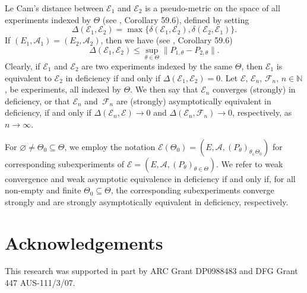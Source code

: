 \documentclass[number,citesort,seceqn,dvips]{arxbj}
\newcommand{\NN}{\mathbb{N}}
\newcommand{\AAA}{{\mathcal A}}
\newcommand{\EEE}{{\mathcal E}}
\newcommand{\FFF}{{\mathcal F}}
\begin{document}
\begin{appendix}
Le Cam's distance between $\EEE_1$ and $\EEE_2$ is a pseudo-metric on
the space of all experiments indexed by $\Theta$ (see
\cite{St85}, Corollary 59.6), defined by setting
%
\begin{equation}\label{deflecam}
\Delta(\EEE_1,\EEE_2) = \max\{
\delta(\EEE_1,\EEE_2),\delta(\EEE_2,\EEE_1) \}.
\end{equation}
%
If $(E_1,\AAA_1)=(E_2,\AAA_2)$, then we have (see
\cite{St85}, Corollary 59.6)
%
\begin{equation}\label{deflecamsmallerTV}
\Delta(\EEE_1,\EEE_2) \le
\sup_{\theta\in\Theta}\|P_{1,\theta}-P_{2,\theta}\| .
\end{equation}
%
Clearly, if $\EEE_1$ and $\EEE_2$ are two experiments indexed by the
same $\Theta$, then $\EEE_1$ is equivalent to $\EEE_2$ in deficiency if
and only if $\Delta(\EEE_1,\EEE_2)=0$. Let $\EEE$, $\EEE_n$, $\FFF_n$,
$n\in\NN$, be experiments, all indexed by $\Theta$. We then say that
$\EEE_n$ converges (strongly) in deficiency, or that $\EEE_n$ and~$\FFF_n$ are (strongly) asymptotically equivalent in deficiency, if and
only if $\Delta(\EEE_n,\EEE) \to0$ and $\Delta(\EEE_n,\FFF_n)
\to0$, respectively, as $n\to\infty$.

For $\varnothing\neq\Theta_0\subseteq\Theta$, we employ the notation
$\EEE(\Theta_0)=(E,\AAA,(P_{\theta})_{\theta_\in\Theta_0})$ for
corresponding subexperiments of
$\EEE=(E,\AAA,(P_\theta)_{\theta\in\Theta})$. We refer to weak
convergence and weak asymptotic equivalence in deficiency if and only
if, for all non-empty and finite $\Theta_0\subseteq\Theta$, the
corresponding subexperiments converge strongly and are strongly
asymptotically equivalent in deficiency, respectively.
\end{appendix}

\section*{Acknowledgements}
This research was supported in part by ARC Grant DP0988483 and DFG
Grant 447 AUS-111/3/07.
\end{document}
